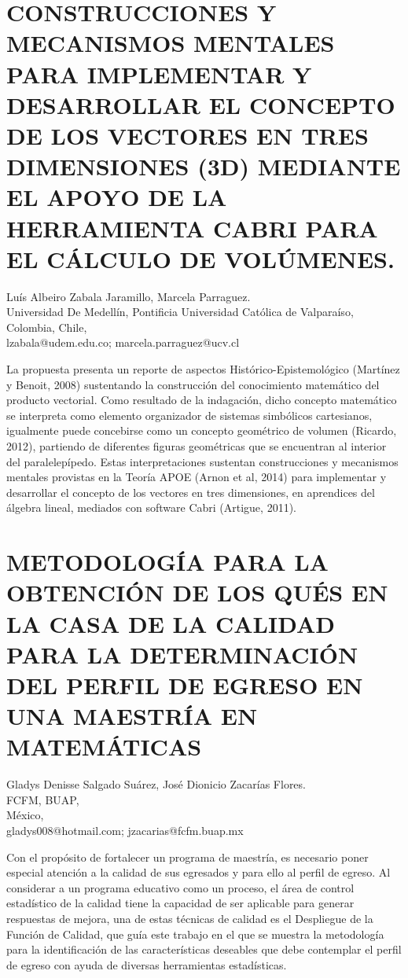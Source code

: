 \section{CONSTRUCCIONES Y MECANISMOS MENTALES PARA IMPLEMENTAR Y DESARROLLAR
EL CONCEPTO DE LOS VECTORES EN TRES DIMENSIONES (3D) MEDIANTE EL APOYO
DE LA HERRAMIENTA CABRI PARA EL CÁLCULO DE VOLÚMENES.}

\begin{datos}
Luís Albeiro Zabala Jaramillo, Marcela Parraguez. \\
 Universidad De Medellín, Pontificia Universidad Católica de Valparaíso, \\
\hfill Colombia, Chile, \\
 \hfill  lzabala@udem.edu.co; marcela.parraguez@ucv.cl
\end{datos}

La propuesta presenta un reporte de aspectos Histórico-Epistemológico
(Martínez y Benoit, 2008) sustentando la construcción del conocimiento
matemático del producto vectorial. Como resultado de la indagación,
dicho concepto matemático se interpreta como elemento organizador
de sistemas simbólicos cartesianos, igualmente puede concebirse como
un concepto geométrico de volumen (Ricardo, 2012), partiendo de diferentes
figuras geométricas que se encuentran al interior del paralelepípedo.
Estas interpretaciones sustentan construcciones y mecanismos mentales
provistas en la Teoría APOE (Arnon et al, 2014) para implementar y
desarrollar el concepto de los vectores en tres dimensiones, en aprendices
del álgebra lineal, mediados con software Cabri (Artigue, 2011).


\section{METODOLOGÍA PARA LA OBTENCIÓN DE LOS QUÉS EN LA CASA DE LA CALIDAD
PARA LA DETERMINACIÓN DEL PERFIL DE EGRESO EN UNA MAESTRÍA EN MATEMÁTICAS }

\begin{datos}
Gladys Denisse Salgado Suárez, José Dionicio Zacarías Flores. \\
 FCFM, BUAP, \\
\hfill México,\\ 
 \hfill  gladys008@hotmail.com; jzacarias@fcfm.buap.mx
\end{datos}

Con el propósito de fortalecer un programa de maestría, es necesario
poner especial atención a la calidad de sus egresados y para ello
al perfil de egreso. Al considerar a un programa educativo como un
proceso, el área de control estadístico de la calidad tiene la capacidad
de ser aplicable para generar respuestas de mejora, una de estas técnicas
de calidad es el Despliegue de la Función de Calidad, que guía este
trabajo en el que se muestra la metodología para la identificación
de las características deseables que debe contemplar el perfil de
egreso con ayuda de diversas herramientas estadísticas. 


